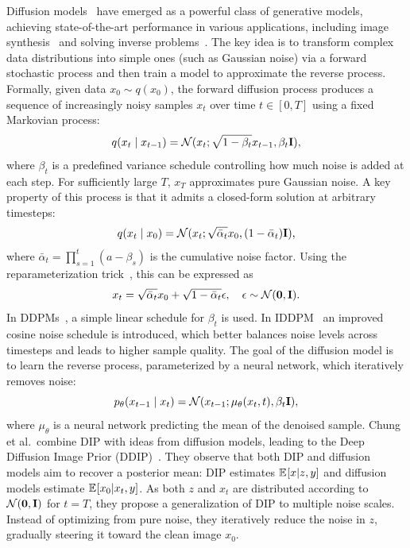 Diffusion models~\cite{Diffusion} have emerged as a powerful class of generative models, achieving state-of-the-art performance in various applications, including image synthesis~\cite{LDM} and solving inverse problems~\cite{DDRM}.
The key idea is to transform complex data distributions into simple ones (such as Gaussian noise) via a forward stochastic process and then train a model to approximate the reverse process.
Formally, given data $x_0 \sim q(x_0)$, the forward diffusion process produces a sequence of increasingly noisy samples $x_t$ over time $t \in [0,T]$ using a fixed Markovian process:
\begin{equation}
    q(x_t \mid x_{t-1}) = \mathcal{N}(x_t;\sqrt{1 - \beta_t} x_{t-1},\beta_t \mathbf{I}),
\end{equation}
where $\beta_t$ is a predefined variance schedule controlling how much noise is added at each step. For sufficiently large $T$, $x_T$ approximates pure Gaussian noise.
A key property of this process is that it admits a closed-form solution at arbitrary timesteps:
\begin{equation}
    q(x_t \mid x_0) = \mathcal{N}(x_t;\sqrt{\bar{\alpha}_t} x_0,(1-\bar{\alpha}_t) \mathbf{I}),
\end{equation}
where $\bar{\alpha}_t = \prod_{s=1}^{t} (a - \beta_s)$ is the cumulative noise factor.
Using the reparameterization trick~\cite{VAE}, this can be expressed as
\begin{equation}
    x_t = \sqrt{\bar{\alpha}_t}x_0 + \sqrt{1-\bar{\alpha}_t}\epsilon, \quad \epsilon \sim \mathcal{N}(\mathbf{0},\mathbf{I}).
\end{equation}
In DDPMs~\cite{DDPM}, a simple linear schedule for $\beta_t$ is used. In IDDPM~\cite{IDDPM} an improved cosine noise schedule is introduced, which better balances noise levels across timesteps and leads to higher sample quality.
The goal of the diffusion model is to learn the reverse process, parameterized by a neural network, which iteratively removes noise:
\begin{equation}
    p_\theta(x_{t-1} \mid x_t) = \mathcal{N}(x_{t-1};\mu_\theta(x_t, t),\beta_t \mathbf{I}),
\end{equation}
where $\mu_\theta$ is a neural network predicting the mean of the denoised sample.
\newpage
Chung et al.\ combine DIP with ideas from diffusion models, leading to the Deep Diffusion Image Prior (DDIP)~\cite{DDIP}.
They observe that both DIP and diffusion models aim to recover a posterior mean:
DIP estimates $\mathbb{E}_{ } [x | z,y]$ and diffusion models estimate $\mathbb{E}_{ } [x_0 | x_t,y]$.
As both $z$ and $x_t$ are distributed according to $\mathcal{N}(\mathbf{0},\mathbf{I})$ for $t=T$, they propose a generalization of DIP to multiple noise scales. Instead of optimizing from pure noise, they iteratively reduce the noise in $z$, gradually steering it toward the clean image $x_0$.
